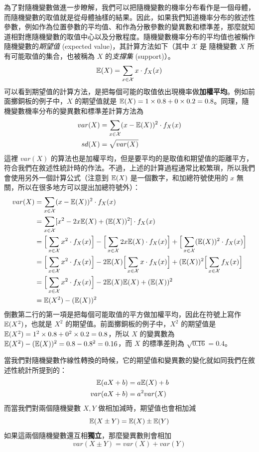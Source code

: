     為了對隨機變數做進一步瞭解，我們可以把隨機變數的機率分布看作是一個母體，而隨機變數的取值就是從母體抽樣的結果。因此，如果我們知道機率分布的敘述性參數，例如作為位置參數的平均值、和作為分散參數的變異數和標準差，那麼就知道相對應隨機變數的取值中心以及分散程度。隨機變數機率分布的平均值也被稱作隨機變數的\textit{期望值} (expected value)，其計算方法如下（其中 $\mathcal{X}$ 是 隨機變數 $X$ 所有可能取值的集合，也被稱為 $X$ 的\textit{支撐集} (support)）。
    \smallskip
    \[\mathbb{E}(X) = \sum_{x\in\mathcal{X}} x \cdot f_X(x)\]
    \smallskip
    可以看到期望值的計算方法，是把每個可能的取值依出現機率做\textbf{加權平均}。例如前面擲銅板的例子中，$X$ 的期望值就是 $\mathbb{E}(X) = 1 \times 0.8 + 0 \times 0.2 = 0.8$。同理，隨機變數機率分布的變異數和標準差計算方法為
    \begin{align*}
        var(X) &= \sum_{x\in\mathcal{X}} (x-\mathbb{E}(X))^2 \cdot f_X(x)\\
        sd(X) &= \sqrt{var(X)}
    \end{align*}
    這裡 $var(X)$ 的算法也是加權平均，但是要平均的是取值和期望值的距離平方，符合我們在敘述性統計時的作法。不過，上述的計算過程通常比較繁瑣，所以我們會使用另外一個計算公式（注意到 $\mathbb{E}(X)$ 是一個數字，和加總符號使用的 $x$ 無關，所以在很多地方可以提出加總符號外）：
    \begin{align*}
        var(X) &= \sum_{x\in\mathcal{X}} (x-\mathbb{E}(X))^2 \cdot f_X(x)\\
        &= \sum_{x\in\mathcal{X}} [x^2 - 2x\mathbb{E}(X) + (\mathbb{E}(X))^2] \cdot f_X(x)\\
        &= \Big[\sum_{x\in\mathcal{X}} x^2 \cdot f_X(x)\Big] - \Big[\sum_{x\in\mathcal{X}} 2x\mathbb{E}(X) \cdot f_X(x)\Big] + \Big[\sum_{x\in\mathcal{X}} (\mathbb{E}(X))^2 \cdot f_X(x)\Big]\\
        &= \Big[\sum_{x\in\mathcal{X}} x^2 \cdot f_X(x)\Big] - 2\mathbb{E}(X)\Big[\sum_{x\in\mathcal{X}} x \cdot f_X(x)\Big] + (\mathbb{E}(X))^2\Big[\sum_{x\in\mathcal{X}} f_X(x)\Big]\\
        &= \Big[\sum_{x\in\mathcal{X}} x^2 \cdot f_X(x)\Big] - 2\mathbb{E}(X)\mathbb{E}(X) + (\mathbb{E}(X))^2\\
        &= \mathbb{E}(X^2) - (\mathbb{E}(X))^2
    \end{align*}
    倒數第二行的第一項是把每個可能取值的平方做加權平均，因此在符號上寫作 $\mathbb{E}(X^2)$，也就是 $X^2$ 的期望值。前面擲銅板的例子中，$X^2$ 的期望值是 $\mathbb{E}(X^2)=1^2 \times 0.8 + 0^2 \times 0.2 = 0.8$，所以 $X$ 的變異數為 $\mathbb{E}(X^2) - (\mathbb{E}(X))^2 = 0.8-0.8^2 = 0.16$，而 $X$ 的標準差則為 $\sqrt{0.16} = 0.4$。

    當我們對隨機變數作線性轉換的時候，它的期望值和變異數的變化就如同我們在敘述性統計所提到的：
    \begin{align*}
        \mathbb{E}(aX+b) &= a\mathbb{E}(X) + b\\
        var(aX+b) &= a^2 var(X)
    \end{align*}
    而當我們對兩個隨機變數 $X, Y$ 做相加減時，期望值也會相加減
    \smallskip
    \[\mathbb{E}(X \pm Y) = \mathbb{E}(X) \pm \mathbb{E}(Y)\]
    \smallskip
    如果這兩個隨機變數還互相\textbf{獨立}，那麼變異數則會相加
    \smallskip
    \[var(X \pm Y) = var(X) + var(Y)\]
    

